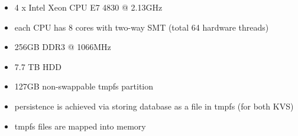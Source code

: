 \begin{itemize}
    \item 4 x Intel Xeon CPU E7 4830 @ 2.13GHz
    \item each CPU has 8 cores with two-way SMT (total 64 hardware threads)
    \item 256GB DDR3 @ 1066MHz
    \item 7.7 TB HDD
    \item 127GB non-swappable tmpfs partition
    \item persistence is achieved via storing database as a file in tmpfs (for both KVS)
    \item tmpfs files are mapped into memory
\end{itemize}
